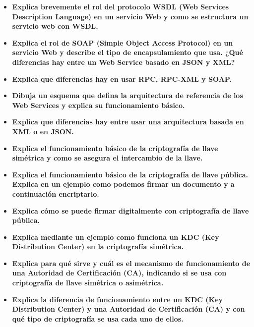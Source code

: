 \documentclass[a4paper,10pt]{article}
\begin{document}
\begin{itemize}
  \item \textbf{
  Explica brevemente el rol del protocolo WSDL (Web Services Description Language) en un
  servicio Web y como se estructura un servicio web con WSDL.
  }
  \item \textbf{
  Explica el rol de SOAP (Simple Object Access Protocol) en un servicio Web y describe el
  tipo de encapsulamiento que usa. ¿Qué diferencias hay entre un Web Service basado en JSON y
  XML?
  }
  \item \textbf{
  Explica que diferencias hay en usar RPC, RPC-XML y SOAP.
  }
  \item \textbf{
  Dibuja un esquema que defina la arquitectura de referencia de los Web Services y explica
  su funcionamiento básico.
  }
  \item \textbf{
  Explica que diferencias hay entre usar una arquitectura basada en XML o en JSON.
  }
  \item \textbf{
  Explica el funcionamiento básico de la criptografía de llave simétrica y como se asegura el
  intercambio de la llave.
  }
  \item \textbf{
  Explica el funcionamiento básico de la criptografía de llave pública. Explica en un ejemplo
  como podemos firmar un documento y a continuación encriptarlo.
  }
  \item \textbf{
  Explica cómo se puede firmar digitalmente con criptografía de llave pública.
  }
  \item \textbf{
  Explica mediante un ejemplo como funciona un KDC (Key Distribution Center) en
  la criptografía simétrica.
  }
  \item \textbf{
  Explica para qué sirve y cuál es el mecanismo de funcionamiento de una
  Autoridad de Certificación (CA), indicando si se usa con criptografía de llave simétrica o
  asimétrica.
  }
  \item \textbf{
  Explica la diferencia de funcionamiento entre un KDC (Key Distribution Center) y
  una Autoridad de Certificación (CA) y con qué tipo de criptografía se usa cada uno de ellos.
  }
\end{itemize}
\end{document}
